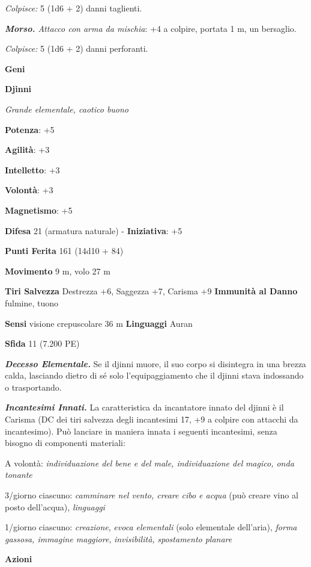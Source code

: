 \begin{multicols}{2}
\emph{Colpisce:} 5 (1d6 + 2) danni taglienti.

\emph{\textbf{Morso.} Attacco con arma da mischia}: +4 a colpire,
portata 1 m, un bersaglio.

\emph{Colpisce:} 5 (1d6 + 2) danni perforanti.



\textbf{Geni}

\textbf{Djinni}

\emph{Grande elementale, caotico buono}

\textbf{Potenza}: +5

\textbf{Agilità}: +3

\textbf{Intelletto}: +3

\textbf{Volontà}: +3

\textbf{Magnetismo}: +5

\textbf{Difesa} 21 (armatura naturale) - \textbf{Iniziativa}: +5

\textbf{Punti Ferita} 161 (14d10 + 84)

\textbf{Movimento} 9 m, volo 27 m

\textbf{Tiri Salvezza} Destrezza +6, Saggezza +7, Carisma +9
\textbf{Immunità al Danno} fulmine, tuono

\textbf{Sensi} visione crepuscolare 36 m
\textbf{Linguaggi} Auran

\textbf{Sfida} 11 (7.200 PE)\smallskip

\emph{\textbf{Decesso Elementale.}} Se il djinni muore, il suo corpo si
disintegra in una brezza calda, lasciando dietro di sé solo
l'equipaggiamento che il djinni stava indossando o trasportando.

\emph{\textbf{Incantesimi Innati.}} La caratteristica da incantatore
innato del djinni è il Carisma (DC dei tiri salvezza degli incantesimi
17, +9 a colpire con attacchi da incantesimo). Può lanciare in maniera
innata i seguenti incantesimi, senza bisogno di componenti materiali:

A volontà: \emph{individuazione del bene e del male, individuazione del}
\emph{magico, onda tonante}

3/giorno ciascuno: \emph{camminare nel vento, creare cibo e acqua} (può
creare vino al posto dell'acqua), \emph{linguaggi}

1/giorno ciascuno: \emph{creazione}, \emph{evoca elementali} (solo
elementale dell'aria), \emph{forma gassosa, immagine maggiore},
\emph{invisibilità,} \emph{spostamento planare}

\smallskip\textbf{Azioni}


\end{multicols}
